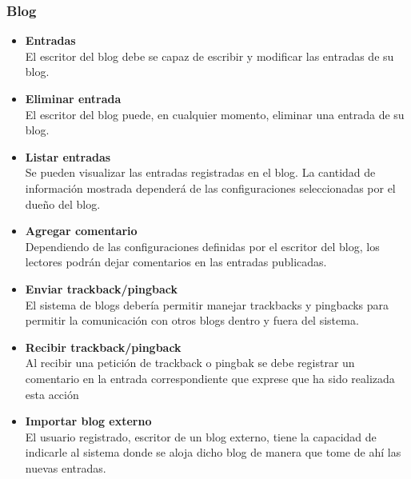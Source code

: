 \subsubsection{Blog}
\begin{itemize}
	\item \textbf{Entradas}\\
	El escritor del blog debe se capaz de escribir y modificar las entradas de su blog.
	\item \textbf{Eliminar entrada}\\
	El escritor del blog puede, en cualquier momento, eliminar una entrada de su blog.
	\item \textbf{Listar entradas}\\
	Se pueden visualizar las entradas registradas en el blog. La cantidad de información mostrada dependerá de las configuraciones seleccionadas por el dueño del blog.
	\item \textbf{Agregar comentario}\\
	Dependiendo de las configuraciones definidas por el escritor del blog, los lectores podrán dejar comentarios en las entradas publicadas.
	\item \textbf{Enviar trackback/pingback}\\
	El sistema de blogs debería permitir manejar trackbacks y pingbacks para permitir la comunicación con otros blogs dentro y fuera del sistema.
	\item \textbf{Recibir trackback/pingback}\\
	Al recibir una petición de trackback o pingbak se debe registrar un comentario en la entrada correspondiente que exprese que ha sido realizada esta acción
	\item \textbf{Importar blog externo}\\
	El usuario registrado, escritor de un blog externo, tiene la capacidad de indicarle al sistema donde se aloja dicho blog de manera que tome de ahí las nuevas entradas. 
\end{itemize}

